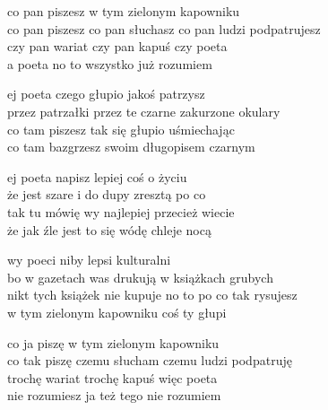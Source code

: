 \begin{text}
    co pan piszesz w tym zielonym kapowniku\\
    co pan piszesz co pan słuchasz co pan ludzi podpatrujesz\\
    czy pan wariat czy pan kapuś czy poeta\\
    a poeta no to wszystko już rozumiem

    ej poeta czego głupio jakoś patrzysz\\
    przez patrzałki przez te czarne zakurzone okulary\\
    co tam piszesz tak się głupio uśmiechając\\
    co tam bazgrzesz swoim długopisem czarnym

    ej poeta napisz lepiej coś o życiu\\
    że jest szare i do dupy zresztą po co\\
    tak tu mówię wy najlepiej przecież wiecie\\
    że jak źle jest to się wódę chleje nocą

    wy poeci niby lepsi kulturalni\\
    bo w gazetach was drukują w książkach grubych\\
    nikt tych książek nie kupuje no to po co tak rysujesz\\
    w tym zielonym kapowniku coś ty głupi

    co ja piszę w tym zielonym kapowniku\\
    co tak piszę czemu słucham czemu ludzi podpatruję\\
    trochę wariat trochę kapuś więc poeta\\
    nie rozumiesz ja też tego nie rozumiem
\end{text}
\begin{chord}

\end{chord}